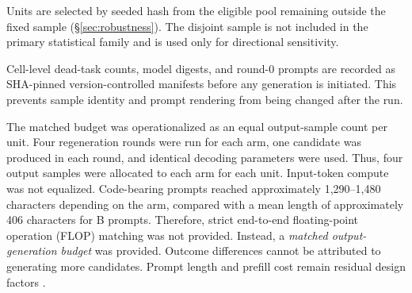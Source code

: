 \documentclass{article}
\numberwithin{equation}{section}  %
\newcommand{\fitwidth}[1]{\resizebox{\ifdim\width>\linewidth \linewidth\else\width\fi}{!}{#1}}
\theoremstyle{definition}
\newcommand{\armB}{\textsf{B}}
\newcommand{\armTC}{\textsf{TC}}
\newcommand{\armCF}{\textsf{CF-SF}}
\newcommand{\Ipub}{\ensuremath{\mathcal{I}_{\mathrm{base}}}}
\newcommand{\Ihid}{\ensuremath{\mathcal{I}_{\mathrm{plus}}}}
\begin{document}
\begin{table}[t]
\centering
\caption{Test-tier provenance. The public tier ($\Ipub$, EvalPlus base input suite) is
available to the harness but is not shown verbatim in any arm. It appears only in the
\armTC{}/\armCF{} arms as $\le 6$ violated input/output (I/O) facts. The prompt-hidden tier
($\Ihid$, EvalPlus plus input suite, first $300$ in source order) is not shown to any arm.
Dead-status selection depends only on public-tier outcomes. The prompt-hidden tier is not used
for selection and is evaluated only during final true-unlock scoring. Therefore, it is not an
untouched held-out set. All tiers use EvalPlus 0.3.1, pinned in \texttt{uv.lock}.}
\label{tab:tierprov}
\fitwidth{}
\end{table}

\begin{table}[t]
\centering\footnotesize
\caption{Prompt-hidden test-count summary. The deterministic first-$300$ cap binds only on
HumanEval+ ($126$ tasks truncated, pre-cap median $972$, max $1000$). On MBPP+ the cap never
binds (max $147$). The cap binds the prompt-hidden tier only. Dead-status selection uses
public-tier outcomes only, so the cap affects final true-unlock scoring rather than dead
selection.}
\label{tab:testcount}
\fitwidth{}
\end{table}

Units are selected by seeded hash from the eligible pool remaining outside the fixed sample
(\S\ref{sec:robustness}). The disjoint sample is not included in the primary statistical
family and is used only for directional sensitivity.

Cell-level dead-task counts, model digests, and round-0 prompts are recorded as SHA-pinned
version-controlled manifests before any generation is initiated. This prevents sample identity
and prompt rendering from being changed after the run.

The matched budget was operationalized as an equal output-sample count per unit. Four
regeneration rounds were run for each arm, one candidate was produced in each round, and
identical decoding parameters were used. Thus, four output samples were allocated to each arm
for each unit. Input-token compute was not equalized. Code-bearing prompts reached approximately
1{,}290--1{,}480 characters depending on the arm, compared with a mean length of approximately
406 characters for \armB{} prompts. Therefore, strict end-to-end floating-point operation (FLOP)
matching was not provided. Instead, a \emph{matched output-generation budget} was provided.
Outcome differences cannot be attributed to generating more candidates. Prompt length and
prefill cost remain residual design factors
\citep{olausson2024selfrepair,brown2024monkeys,zheng2025multiturn}.
\end{document}
